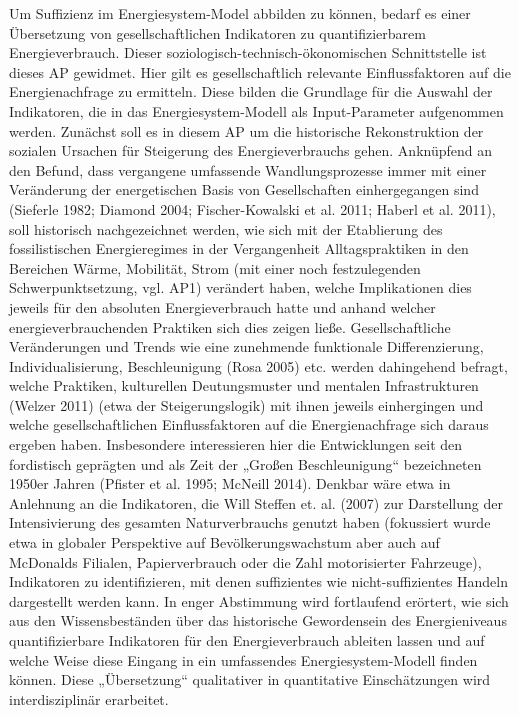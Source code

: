 \documentclass[a4paper,11pt,twoside]{scrartcl}
\begin{document}
Um Suffizienz im Energiesystem-Model abbilden zu können, bedarf es einer Übersetzung von gesellschaftlichen Indikatoren zu quantifizierbarem Energieverbrauch. Dieser soziologisch-technisch-ökonomischen Schnittstelle ist dieses AP gewidmet. Hier gilt es gesellschaftlich relevante Einflussfaktoren auf die Energienachfrage zu ermitteln. Diese bilden die Grundlage für die Auswahl der Indikatoren, die in das Energiesystem-Modell als Input-Parameter aufgenommen werden. Zunächst soll es in diesem AP um die historische Rekonstruktion der sozialen Ursachen für Steigerung des Energieverbrauchs gehen. Anknüpfend an den Befund, dass vergangene umfassende Wandlungsprozesse immer mit einer Veränderung der energetischen Basis von Gesellschaften einhergegangen sind (Sieferle 1982; Diamond 2004; Fischer-Kowalski et al. 2011; Haberl et al. 2011), soll historisch nachgezeichnet werden, wie sich mit der Etablierung des fossilistischen Energieregimes in der Vergangenheit Alltagspraktiken in den Bereichen Wärme, Mobilität, Strom (mit einer noch festzulegenden Schwerpunktsetzung, vgl. AP1) verändert haben, welche Implikationen dies jeweils für den absoluten Energieverbrauch hatte und anhand welcher energieverbrauchenden Praktiken sich dies zeigen ließe. Gesellschaftliche Veränderungen und Trends wie eine zunehmende funktionale Differenzierung, Individualisierung, Beschleunigung (Rosa 2005) etc. werden dahingehend befragt, welche Praktiken, kulturellen Deutungsmuster und mentalen Infrastrukturen (Welzer 2011) (etwa der Steigerungslogik) mit ihnen jeweils einhergingen und welche gesellschaftlichen Einflussfaktoren auf die Energienachfrage sich daraus ergeben haben. Insbesondere interessieren hier die Entwicklungen seit den fordistisch geprägten und als Zeit der „Großen Beschleunigung“ bezeichneten 1950er Jahren (Pfister et al. 1995; McNeill 2014). Denkbar wäre etwa in Anlehnung an die Indikatoren, die Will Steffen et. al. (2007) zur Darstellung der Intensivierung des gesamten Naturverbrauchs genutzt haben (fokussiert wurde etwa in globaler Perspektive auf Bevölkerungswachstum aber auch auf McDonalds Filialen, Papierverbrauch oder die Zahl motorisierter Fahrzeuge), Indikatoren zu identifizieren, mit denen suffizientes wie nicht-suffizientes Handeln dargestellt werden kann. In enger Abstimmung wird fortlaufend erörtert, wie sich aus den Wissensbeständen über das historische Gewordensein des Energieniveaus quantifizierbare Indikatoren für den Energieverbrauch ableiten lassen und auf welche Weise diese Eingang in ein umfassendes Energiesystem-Modell finden können. Diese „Übersetzung“ qualitativer in quantitative Einschätzungen wird interdisziplinär erarbeitet.
\end{document}
